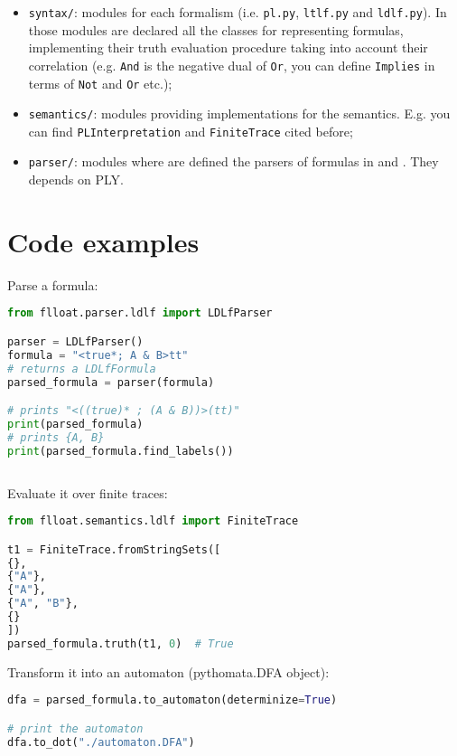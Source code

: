 \begin{itemize}
\begin{itemize}
	\end{itemize}
	\item \texttt{syntax/}: modules for each formalism (i.e. \texttt{pl.py}, \texttt{ltlf.py} and \texttt{ldlf.py}). In those modules are declared all the classes for representing formulas, implementing their truth evaluation procedure  taking into account their correlation (e.g. \texttt{And} is the negative dual of \texttt{Or}, you can define \texttt{Implies} in terms of \texttt{Not} and \texttt{Or} etc.);
	\item \texttt{semantics/}: modules providing implementations for the semantics. E.g. you can find \texttt{PLInterpretation} and \texttt{FiniteTrace} cited before;
	\item \texttt{parser/}: modules where are defined the parsers of formulas in \PL and \LLf. They depends on PLY.
\end{itemize}

\section{Code examples}


Parse a \LDLf formula:

\begin{lstlisting}[language=Python, style=Python]
from flloat.parser.ldlf import LDLfParser

parser = LDLfParser()
formula = "<true*; A & B>tt"
# returns a LDLfFormula
parsed_formula = parser(formula)        

# prints "<((true)* ; (A & B))>(tt)"
print(parsed_formula)                   
# prints {A, B}
print(parsed_formula.find_labels())
     
\end{lstlisting}
Evaluate it over finite traces:

\begin{lstlisting}[language=Python, style=Python]
from flloat.semantics.ldlf import FiniteTrace

t1 = FiniteTrace.fromStringSets([
{},
{"A"},
{"A"},
{"A", "B"},
{}
])
parsed_formula.truth(t1, 0)  # True
\end{lstlisting}
Transform it into an automaton (pythomata.DFA object):

\begin{lstlisting}[language=Python, style=Python]
dfa = parsed_formula.to_automaton(determinize=True)

# print the automaton
dfa.to_dot("./automaton.DFA")
\end{lstlisting}

